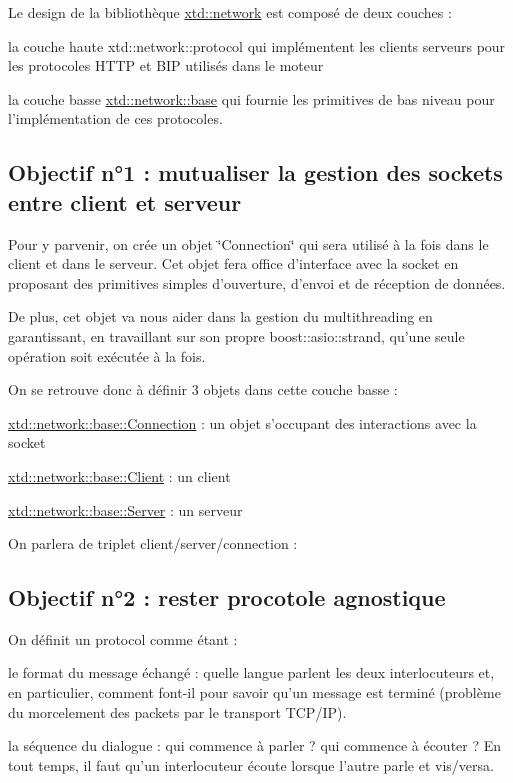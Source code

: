 Le design de la bibliothèque \hyperlink{namespacextd_1_1network}{xtd\-::network} est composé de deux couches \-:
\begin{DoxyItemize}
\item la couche haute xtd\-::network\-::protocol qui implémentent les clients serveurs pour les protocoles H\-T\-T\-P et B\-I\-P utilisés dans le moteur
\item la couche basse \hyperlink{namespacextd_1_1network_1_1base}{xtd\-::network\-::base} qui fournie les primitives de bas niveau pour l'implémentation de ces protocoles.
\end{DoxyItemize}\hypertarget{index_ssec_design_obj1}{}\subsection{Objectif n°1 \-: mutualiser la gestion des sockets entre client et serveur}\label{index_ssec_design_obj1}
Pour y parvenir, on crée un objet \char`\"{}\-Connection\char`\"{} qui sera utilisé à la fois dans le client et dans le serveur. Cet objet fera office d'interface avec la socket en proposant des primitives simples d'ouverture, d'envoi et de réception de données.

De plus, cet objet va nous aider dans la gestion du multithreading en garantissant, en travaillant sur son propre boost\-::asio\-::strand, qu'une seule opération soit exécutée à la fois.

On se retrouve donc à définir 3 objets dans cette couche basse \-:
\begin{DoxyItemize}
\item \hyperlink{classxtd_1_1network_1_1base_1_1Connection}{xtd\-::network\-::base\-::\-Connection} \-: un objet s'occupant des interactions avec la socket
\item \hyperlink{classxtd_1_1network_1_1base_1_1Client}{xtd\-::network\-::base\-::\-Client} \-: un client
\item \hyperlink{classxtd_1_1network_1_1base_1_1Server}{xtd\-::network\-::base\-::\-Server} \-: un serveur
\end{DoxyItemize}



On parlera de triplet client/server/connection \-: \hypertarget{index_ssec_design_obj2}{}\subsection{Objectif n°2 \-: rester procotole agnostique}\label{index_ssec_design_obj2}
On définit un protocol comme étant \-:
\begin{DoxyItemize}
\item le format du message échangé \-: quelle langue parlent les deux interlocuteurs et, en particulier, comment font-\/il pour savoir qu'un message est terminé (problème du morcelement des packets par le transport T\-C\-P/\-I\-P).
\item la séquence du dialogue \-: qui commence à parler ? qui commence à écouter ? En tout temps, il faut qu'un interlocuteur écoute lorsque l'autre parle et vis/versa.
\end{DoxyItemize}

